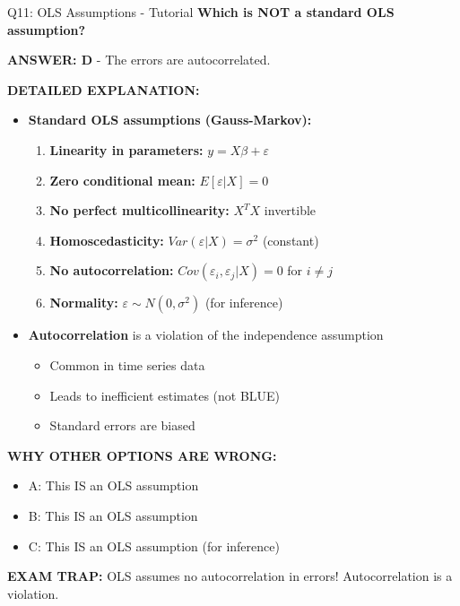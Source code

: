 \documentclass[8pt]{beamer}
\begin{document}
	\begin{frame}{Q11: OLS Assumptions - Tutorial}
		\fontsize{6.5}{7.5}\selectfont
		\textbf{Which is NOT a standard OLS assumption?}
		
		\vspace{0.05cm}
		\textcolor{myblue}{\textbf{ANSWER: D}} - The errors are autocorrelated.
		
		\vspace{0.05cm}
		\textbf{DETAILED EXPLANATION:}
		\begin{itemize}
			\item \textbf{Standard OLS assumptions (Gauss-Markov):}
			\begin{enumerate}
				\item \textbf{Linearity in parameters:} $y = X\beta + \varepsilon$
				\item \textbf{Zero conditional mean:} $E[\varepsilon | X] = 0$
				\item \textbf{No perfect multicollinearity:} $X^TX$ invertible
				\item \textbf{Homoscedasticity:} $Var(\varepsilon | X) = \sigma^2$ (constant)
				\item \textbf{No autocorrelation:} $Cov(\varepsilon_i, \varepsilon_j | X) = 0$ for $i \neq j$
				\item \textbf{Normality:} $\varepsilon \sim N(0, \sigma^2)$ (for inference)
			\end{enumerate}
			\item \textbf{Autocorrelation} is a violation of the independence assumption
			\begin{itemize}
				\item Common in time series data
				\item Leads to inefficient estimates (not BLUE)
				\item Standard errors are biased
			\end{itemize}
		\end{itemize}
		
		\vspace{0.05cm}
		\textcolor{myred}{\textbf{WHY OTHER OPTIONS ARE WRONG:}}
		\begin{itemize}
			\item \textcolor{myred}{A:} This IS an OLS assumption
			\item \textcolor{myred}{B:} This IS an OLS assumption
			\item \textcolor{myred}{C:} This IS an OLS assumption (for inference)
		\end{itemize}
		
		\textcolor{myred}{\textbf{EXAM TRAP:}} OLS assumes \textcolor{myblue}{no autocorrelation} in errors! Autocorrelation is a violation.
	\end{frame}
	
\end{document}
